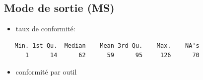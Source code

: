 \documentclass[]{article}
\begin{document}
\subsection{Mode de sortie (MS)}\label{mode-de-sortie-ms}

\begin{itemize}
\itemsep1pt\parskip0pt
\item
  taux de conformité:
\end{itemize}

\begin{verbatim}
   Min. 1st Qu.  Median    Mean 3rd Qu.    Max.    NA's 
      1      14      62      59      95     126      70 
\end{verbatim}

\begin{itemize}
\itemsep1pt\parskip0pt
\item
  conformité par outil
\end{itemize}
\end{document}

